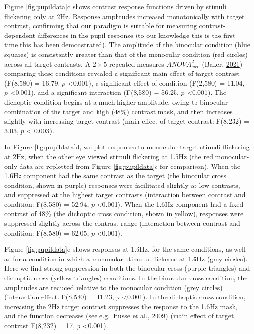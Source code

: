 \documentclass[
]{article}
\begin{document}
Figure \ref{fig:pupildata}c shows contrast response functions driven by stimuli flickering only at 2Hz. Response amplitudes increased monotonically with target contrast, confirming that our paradigm is suitable for measuring contrast-dependent differences in the pupil response (to our knowledge this is the first time this has been demonstrated). The amplitude of the binocular condition (blue squares) is consistently greater than that of the monocular condition (red circles) across all target contrasts. A \(2\times5\) repeated measures \(ANOVA^2_{circ}\) (Baker, \protect\hyperlink{ref-Baker2021}{2021}) comparing these conditions revealed a significant main effect of target contrast (F(8,580) = 16.79, \(p\) \textless0.001), a significant effect of condition (F(2,580) = 11.04, \(p\) \textless0.001), and a significant interaction (F(8,580) = 56.25, \(p\) \textless0.001). The dichoptic condition begins at a much higher amplitude, owing to binocular combination of the target and high (48\%) contrast mask, and then increases slightly with increasing target contrast (main effect of target contrast: F(8,232) = 3.03, \(p\) \textless{} 0.003).

In Figure \ref{fig:pupildata}d, we plot responses to monocular target stimuli flickering at 2Hz, when the other eye viewed stimuli flickering at 1.6Hz (the red monocular-only data are replotted from Figure \ref{fig:pupildata}c for comparison). When the 1.6Hz component had the same contrast as the target (the binocular cross condition, shown in purple) responses were facilitated slightly at low contrasts, and suppressed at the highest target contrasts (interaction between contrast and condition: F(8,580) = 52.94, \(p\) \textless0.001). When the 1.6Hz component had a fixed contrast of 48\% (the dichoptic cross condition, shown in yellow), responses were suppressed slightly across the contrast range (interaction between contrast and condition: F(8,580) = 62.05, \(p\) \textless0.001).

Figure \ref{fig:pupildata}e shows responses at 1.6Hz, for the same conditions, as well as for a condition in which a monocular stimulus flickered at 1.6Hz (grey circles). Here we find strong suppression in both the binocular cross (purple triangles) and dichoptic cross (yellow triangles) conditions. In the binocular cross condition, the amplitudes are reduced relative to the monocular condition (grey circles) (interaction effect: F(8,580) = 41.23, \(p\) \textless0.001). In the dichoptic cross condition, increasing the 2Hz target contrast suppresses the response to the 1.6Hz mask, and the function decreases (see e.g.~Busse et al., \protect\hyperlink{ref-Busse2009}{2009}) (main effect of target contrast F(8,232) = 17, \(p\) \textless0.001).
\end{document}
